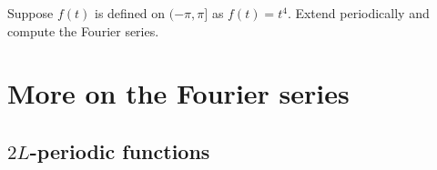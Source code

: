 \begin{exercise}
Suppose $f(t)$ is defined on $(-\pi,\pi]$ as $f(t) = t^4$.
Extend periodically and compute the Fourier series.
\end{exercise}


\sectionnewpage
\section{More on the Fourier series}
\label{moreonfourier:section}



\subsection{$2L$-periodic functions}

